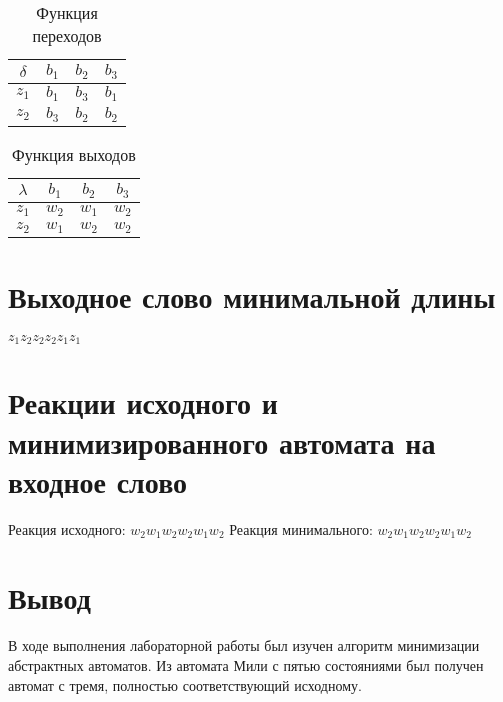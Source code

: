 \documentclass[a4paper,10pt]{article}
\begin{document}
	\begin{table}[h!]
		\center
		\begin{tabular}{|c|c|c|c|}
			\hline
			$\delta$ & $b_1$ & $b_2$ & $b_3$ \\ \hline 
			 $z_1$	 & $b_1$ & $b_3$ & $b_1$ \\ \hline 
			 $z_2$   & $b_3$ & $b_2$ & $b_2$ \\ \hline
		\end{tabular}
		\caption{Функция переходов}
    \end{table}
	\begin{table}[h!]
		\center
		\begin{tabular}{|c|c|c|c|}
			\hline
			$\lambda$ & $b_1$ & $b_2$ & $b_3$ \\ \hline 
			 $z_1$	  & $w_2$ & $w_1$ & $w_2$ \\ \hline 
			 $z_2$    & $w_1$ & $w_2$ & $w_2$ \\ \hline
		\end{tabular}
		\caption{Функция выходов}
    \end{table}

	
\section*{Выходное слово минимальной длины}
    $z_1 z_2 z_2 z_2 z_1 z_1$
\section*{Реакции исходного и минимизированного автомата на входное слово}
	Реакция исходного:    $w_2 w_1 w_2 w_2 w_1 w_2 $
	Реакция минимального: $w_2 w_1 w_2 w_2 w_1 w_2$ 
\section*{Вывод}
	В ходе выполнения лабораторной работы был изучен алгоритм минимизации
	абстрактных автоматов. Из автомата Мили с пятью состояниями был
    получен автомат с тремя, полностью соответствующий исходному.
\end{document}
